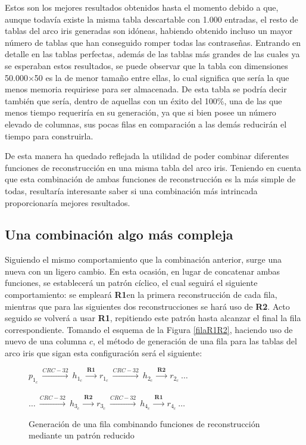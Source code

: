 \documentclass[12pt,spanish,listoffigures,listoftables,listofalgorithms]{tfgetsinf}
\begin{document}
Estos son los mejores resultados obtenidos hasta el momento debido a que, aunque todavía existe la misma tabla descartable con 1.000 entradas, el resto de tablas del arco iris generadas son idóneas, habiendo obtenido incluso un mayor número de tablas que han conseguido romper todas las contraseñas. Entrando en detalle en las tablas perfectas, además de las tablas más grandes de las cuales ya se esperaban estos resultados, se puede observar que la tabla con dimensiones 50.000$\times$50 es la de menor tamaño entre ellas, lo cual significa que sería la que menos memoria requiriese para ser almacenada. De esta tabla se podría decir también que sería, dentro de aquellas con un éxito del 100\%, una de las que menos tiempo requeriría en su generación, ya que si bien posee un número elevado de columnas, sus pocas filas en comparación a las demás reducirán el tiempo para construirla.

De esta manera ha quedado reflejada la utilidad de poder combinar diferentes funciones de reconstrucción en una misma tabla del arco iris. Teniendo en cuenta que esta combinación de ambas funciones de reconstrucción es la más simple de todas, resultaría interesante saber si una combinación más intrincada proporcionaría mejores resultados.

\subsection{Una combinación algo más compleja}

Siguiendo el mismo comportamiento que la combinación anterior, surge una nueva con un ligero cambio. En esta ocasión, en lugar de concatenar ambas funciones, se establecerá un patrón cíclico, el cual seguirá el siguiente comportamiento: se empleará \textbf{R1}en la primera reconstrucción de cada fila, mientras que para las siguientes dos reconstrucciones se hará uso de \textbf{R2}. Acto seguido se volverá a usar \textbf{R1}, repitiendo este patrón hasta alcanzar el final la fila correspondiente. Tomando el esquema de la Figura \ref{filaR1R2}, haciendo uso de nuevo de una columna $c$, el método de generación de una fila para las tablas del arco iris que sigan esta configuración será el siguiente:

\begin{figure}[H]
	
	\centering

	$p_{1_c}~ \xrightarrow{CRC-32}~ h_{1_c}~ \xrightarrow{\textbf{R1}}~ r_{1_c}~ \xrightarrow{CRC-32}~ h_{2_c}~ \xrightarrow{\textbf{R2}}~ r_{2_c}~ \dots$ \\
	~\\
	$\dots~\xrightarrow{CRC-32}~ h_{3_c}~ \xrightarrow{\textbf{R2}}~ r_{3_c}~\xrightarrow{CRC-32}~ h_{4_c}~ \xrightarrow{\textbf{R1}}~ r_{4_c}~\dots$

	\caption{Generación de una fila combinando funciones de reconstrucción mediante un patrón reducido}
	\label{filapp}

\end{figure}
\end{document}
